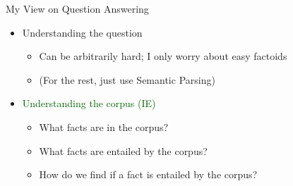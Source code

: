 
\begin{frame}{My View on Question Answering}
\begin{itemize}
  \itemsep 1em
  \item Understanding the question
  \begin{itemize}
    \itemsep 1em
    \item<2-> Can be arbitrarily hard; I only worry about easy factoids
    \item<2-> (For the rest, just use  Semantic Parsing)
  \end{itemize}

  \item \textcolor<3->{darkgreen}{Understanding the corpus (IE)}
  \begin{itemize}
    \itemsep 1em
    \item<4-> What facts are in the corpus? 
      \cite{key:2014angeli-kbp,key:2014angeli-active}
    \item<5-> What facts are entailed by the corpus? 
    \item<6-> How do we find if a fact is entailed by the corpus?
      \cite{key:2013angeli-truth,key:2014angeli-naturalli}
  \end{itemize}
\end{itemize}
\end{frame}

